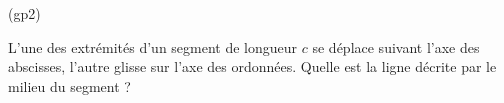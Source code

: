 \begin{tiny}(gp2)\end{tiny}
L'une des extr{\'e}mit{\'e}s d'un segment de longueur $c$ se d{\'e}place
suivant l'axe des abscisses, l'autre glisse sur l'axe des
ordonn{\'e}es. Quelle est la ligne d{\'e}crite par le milieu du segment ?